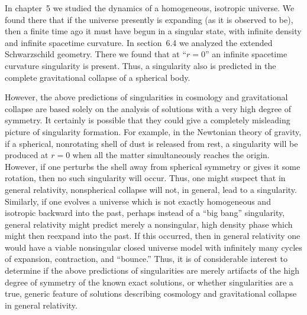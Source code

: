 
\begingroup
\edef\chapterninepreviousfootnote{\number\value{footnote}}
\setcounter{footnote}{0}
\renewcommand{\thetheorem}{\thesubsection.\arabic{theorem}}

In chapter~5 we studied the dynamics of a homogeneous, isotropic universe. We
found there that if the universe presently is expanding (as it is observed to be), then
a finite time ago it must have begun in a singular state, with infinite density and
infinite spacetime curvature. In section~6.4 we analyzed the extended Schwarzschild
geometry. There we found that at ``\(r=0\)'' an infinite spacetime curvature singularity
is present. Thus, a singularity also is predicted in the complete gravitational collapse
of a spherical body.

However, the above predictions of singularities in cosmology and gravitational
collapse are based solely on the analysis of solutions with a very high degree of
symmetry. It certainly is possible that they could give a completely misleading
picture of singularity formation. For example, in the Newtonian theory of gravity,
if a spherical, nonrotating shell of dust is released from rest, a singularity will be
produced at \(r=0\) when all the matter simultaneously reaches the origin. However,
if one perturbs the shell away from spherical symmetry or gives it some rotation, then
no such singularity will occur. Thus, one might suspect that in general relativity,
nonspherical collapse will not, in general, lead to a singularity. Similarly, if one
evolves a universe which is not exactly homogeneous and isotropic backward into
the past, perhaps instead of a ``big bang'' singularity, general relativity might predict
merely a nonsingular, high density phase which might then reexpand into the past.
If this occurred, then in general relativity one would have a viable nonsingular closed
universe model with infinitely many cycles of expansion, contraction, and ``bounce.''
Thus, it is of considerable interest to determine if the above predictions of
singularities are merely artifacts of the high degree of symmetry of the known exact
solutions, or whether singularities are a true, generic feature of solutions describing
cosmology and gravitational collapse in general relativity.

